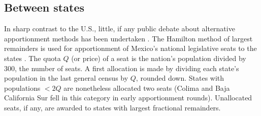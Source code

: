 \documentclass[letter,12pt]{article}
\begin{document}
\subsection{Between states}

In sharp contrast to the U.S., little, if any public debate about alternative apportionment methods has been undertaken \citep{szpiro.numbersRule.2010,balinski.rodriguez.1996}. The Hamilton method of largest remainders is used for apportionment of Mexico's national legislative seats to the states \citep[][:10]{balinskiYoung2001FairRep}. The quota $Q$ (or price) of a seat is the nation's population divided by 300, the number of seats. A first allocation is made by dividing each state's population in the last general census by $Q$, rounded down. States with populations $<2Q$ are nonetheless allocated two seats (Colima and Baja California Sur fell in this category in early apportionment rounds). Unallocated seats, if any, are awarded to states with largest fractional remainders. 
\end{document}
